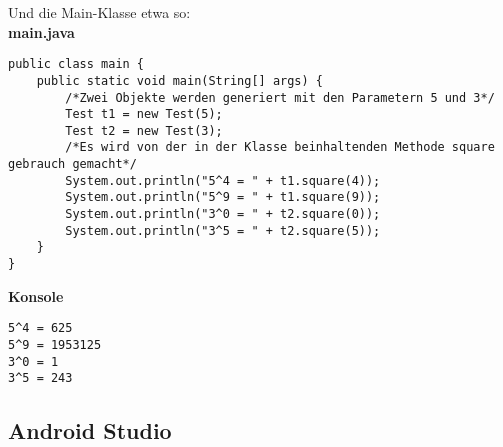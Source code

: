 Und die Main-Klasse etwa so: \\
\textbf{main.java}
\begin{lstlisting}
public class main {
	public static void main(String[] args) {
		/*Zwei Objekte werden generiert mit den Parametern 5 und 3*/
		Test t1 = new Test(5);
		Test t2 = new Test(3);
		/*Es wird von der in der Klasse beinhaltenden Methode square gebrauch gemacht*/
		System.out.println("5^4 = " + t1.square(4));
		System.out.println("5^9 = " + t1.square(9));
		System.out.println("3^0 = " + t2.square(0));
		System.out.println("3^5 = " + t2.square(5));
	}
}
\end{lstlisting}
\textbf{Konsole}
\begin{lstlisting}[style=console]
5^4 = 625
5^9 = 1953125
3^0 = 1
3^5 = 243
\end{lstlisting}
\subsection{Android Studio}